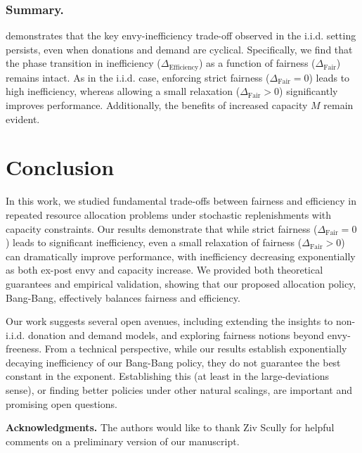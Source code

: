 \documentclass[mnsc,nonblindrev]{informs3}
\newcommand{\ALG}{{Bang-Bang}\xspace}
\newcommand{\Deff}{\Delta_{\text{Efficiency}}\xspace}
\newcommand{\Dfair}{\Delta_{\text{Fair}}\xspace}
\renewcommand{\paragraph}[1]{\subsubsection*{#1}}
\begin{document}
\paragraph{Summary.}  demonstrates that the key envy-inefficiency trade-off observed in the i.i.d. setting persists, even when donations and demand are cyclical.
Specifically, we find that the phase transition in inefficiency ($\Deff$) as a function of fairness ($\Dfair$) remains intact. As in the i.i.d. case, enforcing strict fairness ($\Dfair = 0$) leads to high inefficiency, whereas allowing a small relaxation ($\Dfair > 0$) significantly improves performance. Additionally, the benefits of increased capacity $M$ remain evident.



\section{Conclusion}
\label{sec:conclusion}

In this work, we studied fundamental trade-offs between fairness and efficiency in repeated resource allocation problems under stochastic replenishments with capacity constraints.  Our results demonstrate that while strict fairness ($\Dfair = 0$) leads to significant inefficiency, even a small relaxation of fairness ($\Dfair > 0$) can dramatically improve performance, with inefficiency decreasing exponentially as both ex-post envy and capacity increase.  We provided both theoretical guarantees and empirical validation, showing that our proposed allocation policy, \ALG, effectively balances fairness and efficiency.  

Our work suggests several open avenues, including extending the insights to non-i.i.d. donation and demand models, and exploring fairness notions beyond envy-freeness. From a technical perspective, while our results establish exponentially decaying inefficiency of our \ALG policy, they do not guarantee the best constant in the exponent. Establishing this (at least in the large-deviations sense), or finding better policies under other natural scalings, are important and promising open questions.

\medskip

{\noindent\textbf{Acknowledgments.} The authors would like to thank Ziv Scully for helpful comments on a preliminary version of our manuscript.}

\newpage

\end{document}

